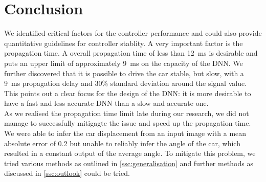 \documentclass[10pt,a4paper,twoside,journal]{IEEEtran}
\begin{document}
\section{Conclusion}
\label{sc:conclusion}
We identified critical factors for the controller performance and could also provide quantitative guidelines for controller stablity. A very important factor is the propagation time. A overall propagation time of less than \SI{12}{\milli\second} is desirable and puts an upper limit of approximately \SI{9}{\milli\second} on the capacity of the DNN. We further discovered that it is possible to drive the car stable, but slow, with a \SI{9}{\milli\second} propagation delay and 30\% standard deviation around the signal value. This points out a clear focus for the design of the DNN: it is more desirable to have a fast and less accurate DNN than a slow and accurate one. \\
As we realised the propagation time limit late during our research, we did not manage to successfully mitigagte the issue and speed up the propagation time. We were able to infer the car displacement from an input image with a mean absolute error of 0.2 but unable to reliably infer the angle of the car, which resulted in a constant output of the average angle. To mitigate this problem, we tried various methods as outlined in \autoref{ssc:generalisation} and further methods as discussed in \autoref{ssc:outlook} could be tried.
\end{document}

